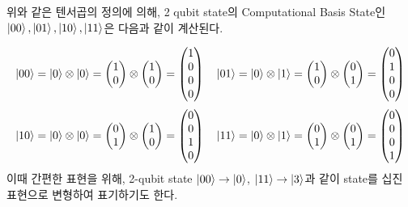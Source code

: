 \noindent 위와 같은 텐서곱의 정의에 의해, 2 qubit state의 Computational Basis State인 \( \ket{00}, \ket{01}, \ket{10}, \ket{11}\)은 다음과 같이 계산된다.

\[
    \ket{00} = \ket{0} \otimes \ket{0} = \begin{pmatrix} 1 \\ 0 \end{pmatrix} \otimes \begin{pmatrix} 1 \\ 0 \end{pmatrix} = \begin{pmatrix} 1 \\ 0 \\ 0 \\ 0 \end{pmatrix} \quad
    \ket{01} = \ket{0} \otimes \ket{1} = \begin{pmatrix} 1 \\ 0 \end{pmatrix} \otimes \begin{pmatrix} 0 \\ 1 \end{pmatrix} = \begin{pmatrix} 0 \\ 1 \\ 0 \\ 0 \end{pmatrix}
\]
\[
    \ket{10} = \ket{0} \otimes \ket{0} = \begin{pmatrix} 0 \\ 1 \end{pmatrix} \otimes \begin{pmatrix} 1 \\ 0 \end{pmatrix} = \begin{pmatrix} 0 \\ 0 \\ 1 \\ 0 \end{pmatrix} \quad
    \ket{11} = \ket{0} \otimes \ket{1} = \begin{pmatrix} 0 \\ 1 \end{pmatrix} \otimes \begin{pmatrix} 0 \\ 1 \end{pmatrix} = \begin{pmatrix} 0 \\ 0 \\ 0 \\ 1 \end{pmatrix}
\]
이때 간편한 표현을 위해, 2-qubit state \( \ket{00} \rightarrow \ket{0} \), \( \ket{11} \rightarrow \ket{3} \)과 같이 state를 십진 표현으로 변형하여 표기하기도 한다.

